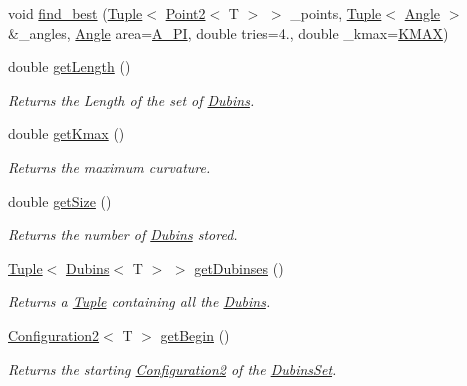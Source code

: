 \begin{DoxyCompactItemize}
void \mbox{\hyperlink{class_dubins_set_a12ea86c3250f8fff7a5db2d759cde33d}{find\+\_\+best}} (\mbox{\hyperlink{class_tuple}{Tuple}}$<$ \mbox{\hyperlink{class_point2}{Point2}}$<$ T $>$ $>$ \+\_\+points, \mbox{\hyperlink{class_tuple}{Tuple}}$<$ \mbox{\hyperlink{class_angle}{Angle}} $>$ \&\+\_\+angles, \mbox{\hyperlink{class_angle}{Angle}} area=\mbox{\hyperlink{maths_8hh_ad7760000c41920a1ae5cf0f6bf0e4c77}{A\+\_\+PI}}, double tries=4., double \+\_\+kmax=\mbox{\hyperlink{dubins_8hh_a940b85a83458e94519f2685b33ddd276}{K\+M\+AX}})
\item 
double \mbox{\hyperlink{class_dubins_set_ad491b5f7e71c3db5ffed11643d2d4e4c}{get\+Length}} ()
\begin{DoxyCompactList}\small\item\em Returns the Length of the set of {\ttfamily \mbox{\hyperlink{class_dubins}{Dubins}}}. \end{DoxyCompactList}\item 
double \mbox{\hyperlink{class_dubins_set_af97fa42a6a9a6325c4d1ed4541758272}{get\+Kmax}} ()
\begin{DoxyCompactList}\small\item\em Returns the maximum curvature. \end{DoxyCompactList}\item 
double \mbox{\hyperlink{class_dubins_set_a41f7dbb6b82c8822e427ee1a3059b8ca}{get\+Size}} ()
\begin{DoxyCompactList}\small\item\em Returns the number of {\ttfamily \mbox{\hyperlink{class_dubins}{Dubins}}} stored. \end{DoxyCompactList}\item 
\mbox{\hyperlink{class_tuple}{Tuple}}$<$ \mbox{\hyperlink{class_dubins}{Dubins}}$<$ T $>$ $>$ \mbox{\hyperlink{class_dubins_set_a2d0216573331d2ca6bf36ea213c4d434}{get\+Dubinses}} ()
\begin{DoxyCompactList}\small\item\em Returns a {\ttfamily \mbox{\hyperlink{class_tuple}{Tuple}}} containing all the {\ttfamily \mbox{\hyperlink{class_dubins}{Dubins}}}. \end{DoxyCompactList}\item 
\mbox{\hyperlink{class_configuration2}{Configuration2}}$<$ T $>$ \mbox{\hyperlink{class_dubins_set_aabfea80321040d789819e0f940a16e50}{get\+Begin}} ()
\begin{DoxyCompactList}\small\item\em Returns the starting {\ttfamily \mbox{\hyperlink{class_configuration2}{Configuration2}}} of the {\ttfamily \mbox{\hyperlink{class_dubins_set}{Dubins\+Set}}}. \end{DoxyCompactList}\item 

\end{DoxyCompactItemize}
